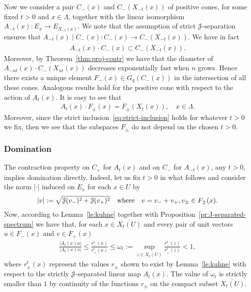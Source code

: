 \documentclass[12pt,reqno]{amsart}
\numberwithin{equation}{section}
\theoremstyle{plain}
\theoremstyle{definition}
\newcommand{\J}{\EuScript{J}}
\begin{document}
Now we consider a pair $C_-(x)$ and $C_-(X_{-t}(x))$ of positive
cones, for some fixed $t>0$ and $x\in\Lambda$, together with
the linear isomorphism $A_{-t}(x): E_x\to E_{X_{-t}(x)}$. We
note that the assumption of strict $\J$-separation ensures
that $A_{-t}(x)\mid C_-(x): C_-(x)\to
C_-(X_{-t}(x))$. We have in fact
\begin{align}\label{eq:strict-inclusion}
  \overline{A_{-t}(x)\cdot C_-(x)}\subset C_-(X_{-t}(x)).
\end{align}
Moreover, by Theorem~\ref{thm:proj-contr} we have that the
diameter of $A_{-nt}(x)\cdot C_-(X_{nt}(x))$ decreases
exponentially fast when $n$ grows. Hence there exists a
unique element $F_-(x)\in G_q(C_-(x))$ in the intersection
of all these cones. Analogous results hold for the positive
cone with respect to the action of $A_t(x)$. It is easy to
see that
\begin{align}\label{eq:F-Axt-inv}
  A_{t}(x)\cdot F_\pm(x)=F_\pm(X_{t}(x)), \quad x\in\Lambda.
\end{align}
Moreover, since the strict
inclusion~\eqref{eq:strict-inclusion} holds for whatever
$t>0$ we fix, then we see that the subspaces $F_\pm$ do not
depend on the chosen $t>0$.



\subsubsection{Domination}
\label{sec:dominat}

The contraction property on $C_+$ for $A_t(x)$ and on $C_-$
for $A_{-t}(x)$, any $t>0$, implies domination
directly. Indeed, let us fix $t>0$ in what follows and
consider the norm $|\cdot|$ induced on $E_x$ for each $x\in
U$ by
\begin{align*}
  |v|:=\sqrt{\J(v_-)^2+\J(v_+)^2} \quad\text{where}\quad
  v=v_-+ v_+, v_\pm\in F_\pm(x).
\end{align*}
Now, according to Lemma~\ref{le:kuhne} together with
Proposition~\ref{pr:J-separated-spectrum} we have that, for
each $x\in \overline{X_t(U)}$ and every pair of unit vectors
$u\in F_-(x)$ and $v\in F_+(x)$
\begin{align*}
  \frac{|A_t(x)u|}{|A_{t}(x) v|}\le
  \frac{r_-^t(x)}{r_+^t(x)}\le
  \omega_t:=\sup_{z\in\overline{X_t(U)}}\frac{r_-^t(z)}{r_+^t(z)}   <1,
\end{align*}
where $r_\pm^t(x)$ represent the values $r_\pm$ shown to
exist by Lemma~\ref{le:kuhne} with respect to the strictly
$\J$-separated linear map $A_t(x)$. The value of $\omega_t$ is
strictly smaller than $1$ by continuity of the functions
$r_\pm$ on the compact subset $\overline{X_t(U)}$.
\end{document}
